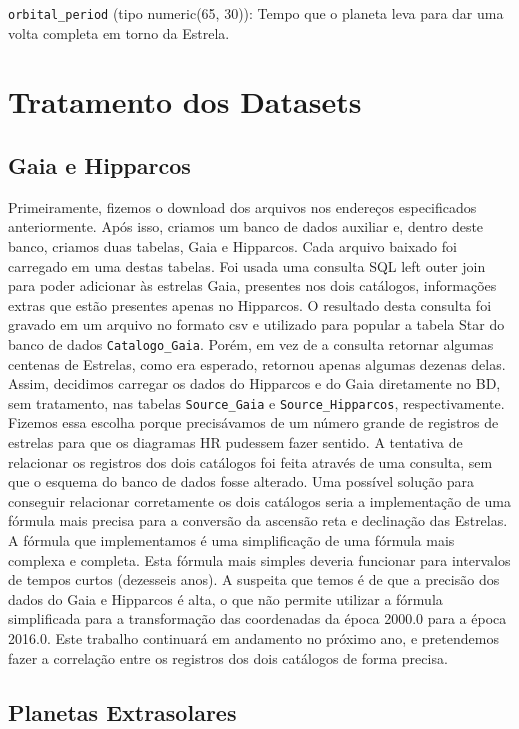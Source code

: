 \documentclass[12pt, a4paper]{article}
\begin{document}
	\verb|orbital_period| (tipo numeric(65, 30)): 
	Tempo que o planeta leva para dar uma volta completa em torno da Estrela.
	
	\section{Tratamento dos Datasets}
	
	\subsection{Gaia e Hipparcos}
	
	Primeiramente, fizemos o download dos arquivos nos endereços especificados anteriormente. Após isso, criamos um banco de dados auxiliar e, dentro deste banco, criamos duas tabelas, Gaia e Hipparcos. Cada arquivo baixado foi carregado em uma destas tabelas. Foi usada uma consulta SQL left outer join para poder adicionar às estrelas Gaia, presentes nos dois catálogos, informações extras que estão presentes apenas no Hipparcos. O resultado desta consulta foi gravado em um arquivo no formato csv e utilizado para popular a tabela Star do banco de dados \verb|Catalogo_Gaia|. Porém, em vez de a consulta retornar algumas centenas de Estrelas, como era esperado, retornou apenas algumas dezenas delas. Assim, decidimos carregar os dados do Hipparcos e do Gaia diretamente no BD, sem tratamento, nas tabelas \verb|Source_Gaia| e \verb|Source_Hipparcos|, respectivamente. Fizemos essa escolha porque precisávamos de um número grande de registros de estrelas para que os diagramas HR pudessem fazer sentido. A tentativa de relacionar os registros dos dois catálogos foi feita através de uma consulta, sem que o esquema do banco de dados fosse alterado.
	Uma possível solução para conseguir relacionar corretamente os dois catálogos seria a implementação de uma fórmula mais precisa para a conversão da ascensão reta e declinação das Estrelas. A fórmula que implementamos é uma simplificação de uma fórmula mais complexa e completa. Esta fórmula mais simples deveria funcionar para intervalos de tempos curtos (dezesseis anos). A suspeita que temos é de que a precisão dos dados do Gaia e Hipparcos é alta, o que não permite utilizar a fórmula simplificada para a transformação das coordenadas da época 2000.0 para a época 2016.0. Este trabalho continuará em andamento no próximo ano, e pretendemos fazer a correlação entre os registros dos dois catálogos de forma precisa.
	
	\subsection{Planetas Extrasolares}
	
\end{document}
